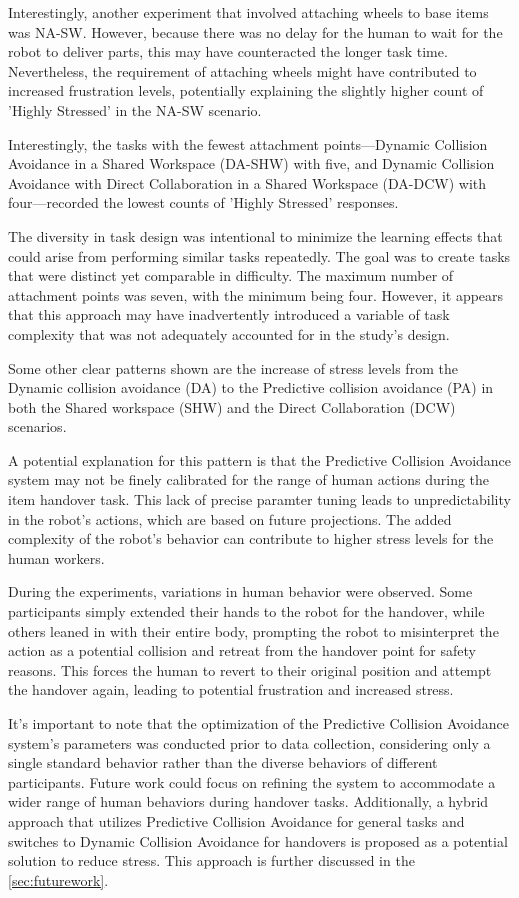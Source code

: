 Interestingly, another experiment that involved attaching wheels to base items was NA-SW. However, because there was no delay for the human to wait for the robot to deliver parts, this may have counteracted the longer task time. Nevertheless, the requirement of attaching wheels might have contributed to increased frustration levels, potentially explaining the slightly higher count of 'Highly Stressed' in the NA-SW scenario.

Interestingly, the tasks with the fewest attachment points—Dynamic Collision Avoidance in a Shared Workspace (DA-SHW) with five, and Dynamic Collision Avoidance with Direct Collaboration in a Shared Workspace (DA-DCW) with four—recorded the lowest counts of 'Highly Stressed' responses.

The diversity in task design was intentional to minimize the learning effects that could arise from performing similar tasks repeatedly. The goal was to create tasks that were distinct yet comparable in difficulty. The maximum number of attachment points was seven, with the minimum being four. However, it appears that this approach may have inadvertently introduced a variable of task complexity that was not adequately accounted for in the study's design.

Some other clear patterns shown are the increase of stress levels from the Dynamic collision avoidance (DA) to the Predictive collision avoidance (PA) in both the Shared workspace (SHW) and the Direct Collaboration (DCW) scenarios.

A potential explanation for this pattern is that the Predictive Collision Avoidance system may not be finely calibrated for the range of human actions during the item handover task. This lack of precise paramter tuning leads to unpredictability in the robot's actions, which are based on future projections. The added complexity of the robot's behavior can contribute to higher stress levels for the human workers.

During the experiments, variations in human behavior were observed. Some participants simply extended their hands to the robot for the handover, while others leaned in with their entire body, prompting the robot to misinterpret the action as a potential collision and retreat from the handover point for safety reasons. This forces the human to revert to their original position and attempt the handover again, leading to potential frustration and increased stress.

It's important to note that the optimization of the Predictive Collision Avoidance system's parameters was conducted prior to data collection, considering only a single standard behavior rather than the diverse behaviors of different participants. Future work could focus on refining the system to accommodate a wider range of human behaviors during handover tasks. Additionally, a hybrid approach that utilizes Predictive Collision Avoidance for general tasks and switches to Dynamic Collision Avoidance for handovers is proposed as a potential solution to reduce stress. This approach is further discussed in the \autoref{sec:futurework}.


